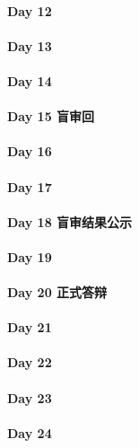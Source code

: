 \documentclass[UTF8,a4paper,8pt]{ctexart}
\begin{document}
 	 \paragraph{Day 12      \quad     }
 	 \paragraph{Day 13      \quad     }
 	 \paragraph{Day 14      \quad     }
 	 \paragraph{Day 15   盲审回   \quad     }
 	 \paragraph{Day 16      \quad     }
 	 \paragraph{Day 17      \quad     }
 	 \paragraph{Day 18   盲审结果公示    \quad     }
 	 \paragraph{Day 19      \quad     }
 	 \paragraph{Day 20   正式答辩   \quad     }
 	 \paragraph{Day 21      \quad     }
 	 \paragraph{Day 22      \quad     }
 	 \paragraph{Day 23      \quad     }
 	 \paragraph{Day 24      \quad     }
\end{document}
